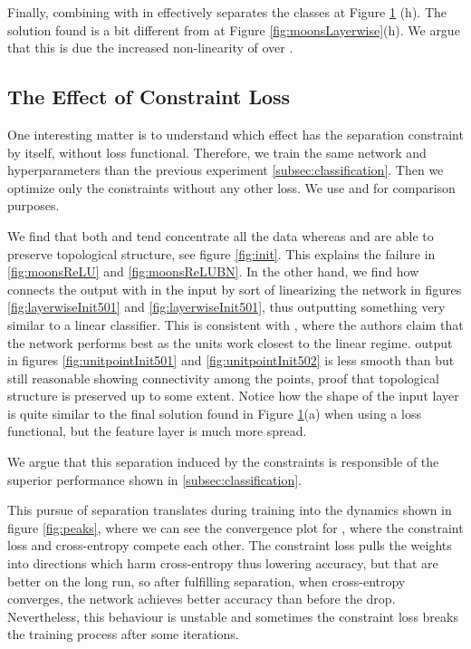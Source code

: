 \begin{figure}
{{    }
  }

    \caption{\SepUnitPoint}
    \label{fig:moonsUnitpointwise}
\end{figure}

Finally, combining \SepUnit with \SepPoint in \SepUnitPoint effectively separates the classes at Figure \ref{fig:moonsUnitpointwise} (h). The solution found is a bit different from \SepLayer at Figure \ref{fig:moonsLayerwise}(h). We argue that this is due the increased non-linearity of \SepUnit over \SepLayer.

\subsection{The Effect of Constraint Loss}\label{subsec:effectConstraintLoss}

One interesting matter is to understand which effect has the separation constraint by itself, without loss functional. Therefore, we train the same network and hyperparameters than the previous experiment  \ref{subsec:classification}. Then we optimize only the constraints without any other loss. We use \ReLU and \ReLUBN for comparison purposes. 

We find that both \ReLU and \ReLUBN tend concentrate all the data whereas \SepUnitPoint and \SepLayer are able to preserve topological structure, see figure \ref{fig:init}. This explains the failure in \ref{fig:moonsReLU} and \ref{fig:moonsReLUBN}. 
In the other hand, we find how \SepLayer connects the output with in the input by sort of linearizing the network in figures \ref{fig:layerwiseInit501} and \ref{fig:layerwiseInit501}, thus outputting something very similar to a linear classifier. This is consistent with \cite{batchnormGradientExplosion}, where the authors claim that the network performs best as the units work closest to the linear regime. 
\SepUnitPoint output in figures \ref{fig:unitpointInit501} and \ref{fig:unitpointInit502} is less smooth than \SepLayer but still reasonable showing connectivity among the points, proof that topological structure is preserved up to some extent. Notice how the shape of the input layer is quite similar to the final solution found in Figure \ref{fig:moonsUnitpointwise}(a) when using a loss functional, but the feature layer is much more spread. 

We argue that this separation induced by the constraints is responsible of the superior performance shown in \ref{subsec:classification}.

This pursue of separation translates during training into the dynamics shown in figure \ref{fig:peaks}, where we can see the convergence plot for \SepUnitPoint, where the constraint loss and cross-entropy compete each other. The constraint loss pulls the weights into directions which harm cross-entropy thus lowering accuracy, but that are better on the long run, so after fulfilling separation, when cross-entropy converges, the network achieves better accuracy than before the drop. Nevertheless, this behaviour is unstable and sometimes the constraint loss breaks the training process after some iterations.

